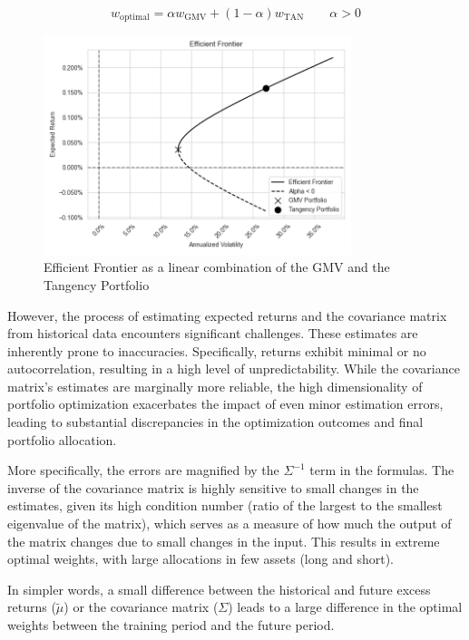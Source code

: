 \documentclass{article}
\begin{document}
$$
w_{\text{optimal}} = \alpha w_{\text{GMV}} + (1 - \alpha) w_{\text{TAN}} \quad \quad \alpha > 0
$$

\begin{figure}[h]
    \centering
    \includegraphics[width=0.8\textwidth]{graphics/illustrations/efficient_frontier.png}
    \caption{Efficient Frontier as a linear combination of the GMV and the Tangency Portfolio}
    \label{fig:efficient_frontier}
\end{figure}

However, the process of estimating expected returns and the covariance matrix from historical data encounters significant challenges. These estimates are inherently prone to inaccuracies. Specifically, returns exhibit minimal or no autocorrelation, resulting in a high level of unpredictability. While the covariance matrix's estimates are marginally more reliable, the high dimensionality of portfolio optimization exacerbates the impact of even minor estimation errors, leading to substantial discrepancies in the optimization outcomes and final portfolio allocation.

More specifically, the errors are magnified by the $\Sigma^{-1}$ term in the formulas. The inverse of the covariance matrix is highly sensitive to small changes in the estimates, given its high condition number (ratio of the largest to the smallest eigenvalue of the matrix), which serves as a measure of how much the output of the matrix changes due to small changes in the input. This results in extreme optimal weights, with large allocations in few assets (long and short).

In simpler words, a small difference between the historical and future excess returns ($\tilde{\mu}$) or the covariance matrix ($\Sigma$) leads to a large difference in the optimal weights between the training period and the future period.
\end{document}
